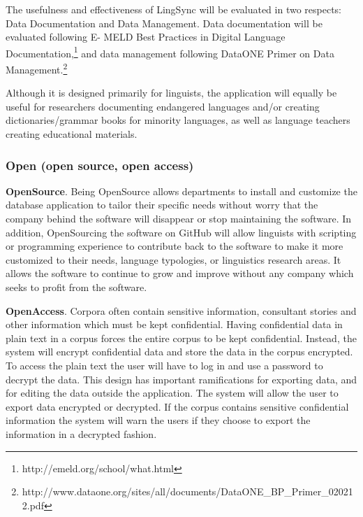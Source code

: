 \documentclass[letterpaper, 12pt, dvips]{mitwpl}
\begin{document}
The usefulness and effectiveness of LingSync will be evaluated in two respects: Data Documentation and Data Management. Data documentation will be evaluated following E-  MELD Best Practices in Digital Language Documentation,\footnote{http://emeld.org/school/what.html} and data management following DataONE Primer on Data Management.\footnote{http://www.dataone.org/sites/all/documents/DataONE\_BP\_Primer\_020212.pdf}





Although it is designed primarily for linguists, the application will equally be useful for researchers documenting endangered languages and/or creating dictionaries/grammar books for minority languages, as well as language teachers creating educational materials.  


\subsubsection{Open (open source, open access)}


\begin{description}

\item { \bf OpenSource}. Being OpenSource allows departments to install and customize the database application to tailor their specific needs without worry that the company behind the software will disappear or stop maintaining the software. In addition, OpenSourcing the software on GitHub will allow linguists with scripting or programming experience to contribute back to the software to make it more customized to their needs, language typologies, or linguistics research areas. It allows the software to continue to grow and improve without any company which seeks to profit from the software.
 

\item {\bf OpenAccess}. Corpora often contain sensitive information, consultant stories and other information which must be kept confidential. Having confidential data in plain text in a corpus forces the entire corpus to be kept confidential. Instead, the system will encrypt confidential data and store the data in the corpus encrypted. To access the plain text the user will have to log in and use a password to decrypt the data. This design has important ramifications for exporting data, and for editing the data outside the application. The system will allow the user to export data encrypted or decrypted. If the corpus contains sensitive confidential information the system will warn the users if they choose to export the information in a decrypted fashion.


\end{description}
\end{document}
